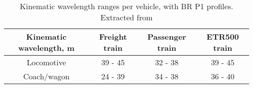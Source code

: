 \begin{appendices}
\begin{table}[h]
    \centering
    \begin{tabular}{c|c|c|c}
    \hline
    Kinematic wavelength, m & Freight train & Passenger train & ETR500 train \\
    \hline
    Locomotive & 39 - 45 & 32 - 38 & 39 - 45 \\
    Coach/wagon & 24 - 39 & 34 - 38 & 36 - 40 \\
    \hline
    \end{tabular}
    \caption{Kinematic wavelength ranges per vehicle, with BR P1 profiles. Extracted from \citet[Appendix C]{d181dt329}}
    \label{tab:329kinematicwavelength}
\end{table}

 







\end{appendices}
